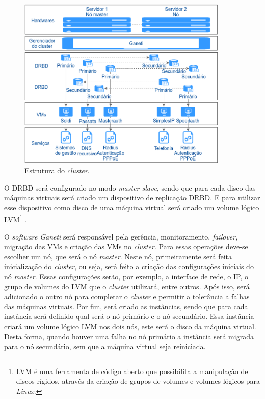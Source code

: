 \begin{figure}[h!]
 \centering
 \includegraphics[width=380px]{img/projeto_estrutura.eps}
 \caption{Estrutura do \textit{cluster}.}
 \label{fig:projeto_estrutura}
\end{figure}

O \ac{DRBD} será configurado no modo \textit{master-slave}, sendo que para cada disco das máquinas virtuais será criado um dispositivo de 
replicação \ac{DRBD}. E para utilizar esse dispositivo como disco de uma máquina virtual será criado um volume lógico 
\ac{LVM}\footnote{LVM é uma ferramenta de código aberto que possibilita a manipulação de discos rígidos, através da criação de grupos de volumes 
e volumes lógicos para \textit{Linux}.} \cite{lvm}. 

O \textit{software} \textit{Ganeti} será responsável pela gerência, monitoramento, \textit{failover}, migração das \acp{VM} e criação das \acp{VM} 
no \textit{cluster}. Para essas operações deve-se escolher um nó, que será o nó \textit{master}. Neste nó, primeiramente será feita inicialização 
do \textit{cluster}, ou seja, será feito a criação das configurações iniciais do nó \textit{master}. Essas configurações serão, por exemplo, 
a interface de rede, o \ac{IP}, o grupo de volumes do \ac{LVM} que o \textit{cluster} utilizará, entre outros. Após isso, será adicionado o outro 
nó para completar o \textit{cluster} e permitir a tolerância a falhas das máquinas virtuais. Por fim, será criado as instâncias, sendo que para 
cada instância será definido qual será o nó primário e o nó secundário. Essa instância criará um volume lógico \ac{LVM} nos dois nós, este será
o disco da máquina virtual. Desta forma, quando houver uma falha no nó primário a instância será migrada para o nó secundário, sem que a máquina 
virtual seja reiniciada.

